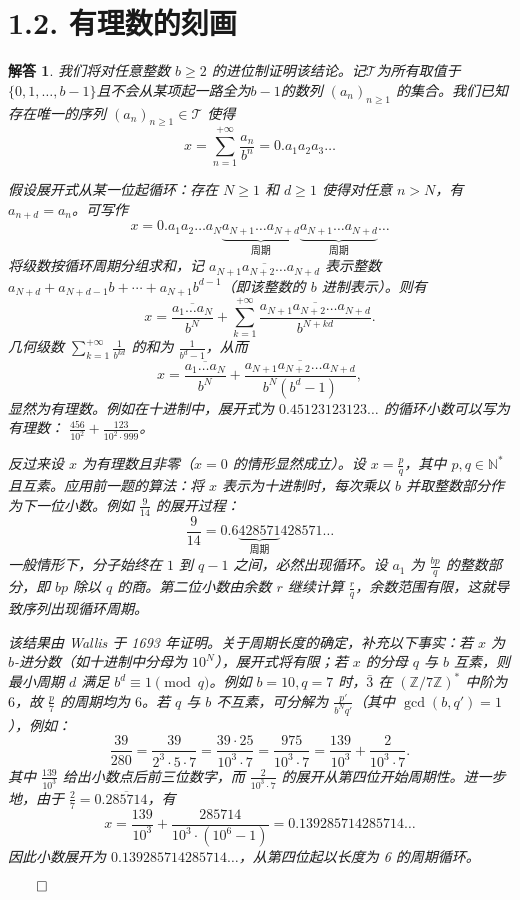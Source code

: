 \documentclass[12pt,UTF8]{ctexbook}
\theoremstyle{exercisestyle}
\theoremstyle{solutionstyle}
\newtheorem*{solution*}{解答}
\newenvironment{solution}
  {\begin{solution*}}
  {\hfill\ensuremath{\qed}\end{solution*}}
\begin{document}
\section{1.2. 有理数的刻画}\label{caractérisation-des-rationnels}
\begin{solution}
我们将对任意整数 $b \geqslant 2$ 的进位制证明该结论。记$\mathcal T$为所有取值于$\{0,1,\ldots,b-1\}$且不会从某项起一路全为$b-1$的数列 $(a_n)_{n\geq 1}$ 的集合。我们已知存在唯一的序列 $(a_n)_{n\geq 1} \in \mathcal{T}$ 使得
$$
x = \sum_{n=1}^{+\infty} \frac{a_n}{b^n} = 0.a_1 a_2 a_3 \dots
$$

\begin{subquestions}
\item 假设展开式从某一位起循环：存在 $N \geq 1$ 和 $d \geq 1$ 使得对任意 $n > N$，有 $a_{n+d} = a_n$。可写作
$$
x = 0.a_1 a_2 \dots a_N \underbrace{a_{N+1} \dots a_{N+d}}_{\text{周期}} \underbrace{a_{N+1} \dots a_{N+d}}_{\text{周期}} \dots
$$
将级数按循环周期分组求和，记 $\overline{a_{N+1}a_{N+2}\ldots a_{N+d}}$ 表示整数 $a_{N+d} + a_{N+d-1}b + \cdots + a_{N+1}b^{d-1}$（即该整数的 $b$ 进制表示）。则有
$$
x = \frac{\overline{a_1 \dots a_N}}{b^N} + \sum_{k=1}^{+\infty} \frac{\overline{a_{N+1} a_{N+2} \dots a_{N+d}}}{b^{N+kd}}.
$$
几何级数 $\sum_{k=1}^{+\infty} \frac{1}{b^{kd}}$ 的和为 $\frac{1}{b^d-1}$，从而
$$
x = \frac{\overline{a_1 \dots a_N}}{b^N} + \frac{\overline{a_{N+1} a_{N+2} \dots a_{N+d}}}{b^N (b^d - 1)},
$$
显然为有理数。例如在十进制中，展开式为 $0.45123123123\ldots$ 的循环小数可以写为有理数： $\frac{456}{10^2} + \frac{123}{10^2 \cdot 999}$。

\item 反过来设 $x$ 为有理数且非零（$x=0$ 的情形显然成立）。设 $x = \frac{p}{q}$，其中 $p,q \in \mathbb{N}^*$ 且互素。应用前一题的算法：将 $x$ 表示为十进制时，每次乘以 $b$ 并取整数部分作为下一位小数。例如 $\frac{9}{14}$ 的展开过程：
$$
\frac{9}{14} = 0.6\underbrace{428571}_{\text{周期}}428571\dots
$$
一般情形下，分子始终在 $1$ 到 $q-1$ 之间，必然出现循环。设 $a_1$ 为 $\frac{bp}{q}$ 的整数部分，即 $bp$ 除以 $q$ 的商。第二位小数由余数 $r$ 继续计算 $\frac{r}{q}$，余数范围有限，这就导致序列出现循环周期。
\end{subquestions}

该结果由 Wallis 于 1693 年证明。关于周期长度的确定，补充以下事实：若 $x$ 为 $b$-进分数（如十进制中分母为 $10^N$），展开式将有限；若 $x$ 的分母 $q$ 与 $b$ 互素，则最小周期 $d$ 满足 $b^d \equiv 1 \pmod{q}$。例如 $b=10,q=7$ 时，$\bar{3}$ 在 $(\mathbb{Z}/7\mathbb{Z})^*$ 中阶为 $6$，故 $\frac{p}{7}$ 的周期均为 $6$。若 $q$ 与 $b$ 不互素，可分解为 $\frac{p'}{b^Nq'}$（其中 $\gcd(b,q')=1$），例如：
$$
\frac{39}{280} = \frac{39}{2^3 \cdot 5 \cdot 7} = \frac{39 \cdot 25}{10^3 \cdot 7} = \frac{975}{10^3 \cdot 7} = \frac{139}{10^3} + \frac{2}{10^3 \cdot 7}.
$$
其中 $\frac{139}{10^3}$ 给出小数点后前三位数字，而 $\frac{2}{10^3 \cdot 7}$ 的展开从第四位开始周期性。进一步地，由于 $\frac{2}{7} = 0.\overline{285714}$，有
$$
x = \frac{139}{10^3} + \frac{285714}{10^3 \cdot (10^6 - 1)} = 0.139285714285714\ldots
$$
因此小数展开为 $0.139285714285714\ldots$，从第四位起以长度为 6 的周期循环。


\end{solution}
\end{document}
